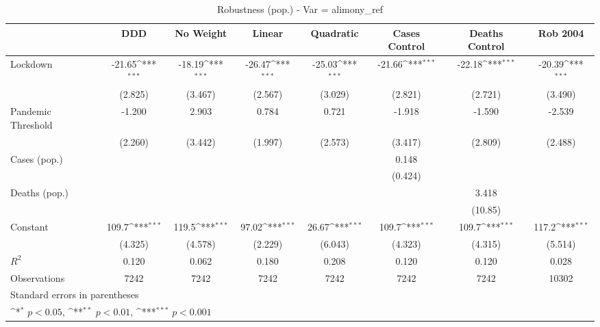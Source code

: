 \documentclass{article}
\begin{document}
{
\def\sym#1{\ifmmode^{#1}\else\(^{#1}\)\fi}
\begin{longtable}{l*{7}{c}}
\caption{Robustness (pop.) - Var = alimony\_ref}\\
\hline\hline\endfirsthead\hline\endhead\hline\endfoot\endlastfoot
                &\multicolumn{1}{c}{DDD}&\multicolumn{1}{c}{No Weight}&\multicolumn{1}{c}{Linear}&\multicolumn{1}{c}{Quadratic}&\multicolumn{1}{c}{Cases Control}&\multicolumn{1}{c}{Deaths Control}&\multicolumn{1}{c}{Rob 2004}\\
\hline
Lockdown        &   -21.65\sym{***}&   -18.19\sym{***}&   -26.47\sym{***}&   -25.03\sym{***}&   -21.66\sym{***}&   -22.18\sym{***}&   -20.39\sym{***}\\
                &  (2.825)         &  (3.467)         &  (2.567)         &  (3.029)         &  (2.821)         &  (2.721)         &  (3.490)         \\
Pandemic Threshold&   -1.200         &    2.903         &    0.784         &    0.721         &   -1.918         &   -1.590         &   -2.539         \\
                &  (2.260)         &  (3.442)         &  (1.997)         &  (2.573)         &  (3.417)         &  (2.809)         &  (2.488)         \\
Cases (pop.)    &                  &                  &                  &                  &    0.148         &                  &                  \\
                &                  &                  &                  &                  &  (0.424)         &                  &                  \\
Deaths (pop.)   &                  &                  &                  &                  &                  &    3.418         &                  \\
                &                  &                  &                  &                  &                  &  (10.85)         &                  \\
Constant        &    109.7\sym{***}&    119.5\sym{***}&    97.02\sym{***}&    26.67\sym{***}&    109.7\sym{***}&    109.7\sym{***}&    117.2\sym{***}\\
                &  (4.325)         &  (4.578)         &  (2.229)         &  (6.043)         &  (4.323)         &  (4.315)         &  (5.514)         \\
\hline
\(R^{2}\)       &    0.120         &    0.062         &    0.180         &    0.208         &    0.120         &    0.120         &    0.028         \\
Observations    &     7242         &     7242         &     7242         &     7242         &     7242         &     7242         &    10302         \\
\hline\hline
\multicolumn{8}{l}{\footnotesize Standard errors in parentheses}\\
\multicolumn{8}{l}{\footnotesize \sym{*} \(p<0.05\), \sym{**} \(p<0.01\), \sym{***} \(p<0.001\)}\\
\end{longtable}
}
\end{document}
